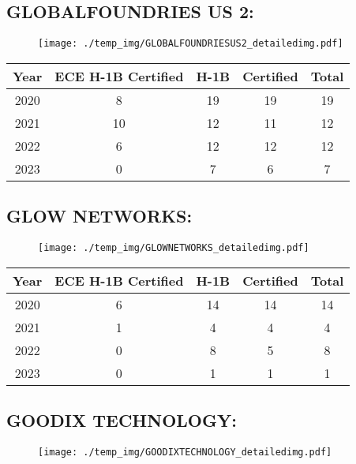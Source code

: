\documentclass{article}%
\begin{document}
%
\newpage%
\subsection{GLOBALFOUNDRIES US 2:}%
\label{subsec:GLOBALFOUNDRIESUS2}%
\label{GLOBALFOUNDRIESUS2detailed}%


\begin{figure}[htbp]%
\centering%
\texttt{[image: ./temp\_img/GLOBALFOUNDRIESUS2\_detailedimg.pdf]}%
\end{figure}

%
\begin{longtable}{c|c|c|c|c}%
\hline%
Year&ECE H{-}1B Certified&H{-}1B&Certified&Total\\%
\hline%
2020&8&19&19&19\\%
\hline%
2021&10&12&11&12\\%
\hline%
2022&6&12&12&12\\%
\hline%
2023&0&7&6&7\\%
\hline%
\end{longtable}

%
\newpage%
\subsection{GLOW NETWORKS:}%
\label{subsec:GLOWNETWORKS}%
\label{GLOWNETWORKSdetailed}%


\begin{figure}[htbp]%
\centering%
\texttt{[image: ./temp\_img/GLOWNETWORKS\_detailedimg.pdf]}%
\end{figure}

%
\begin{longtable}{c|c|c|c|c}%
\hline%
Year&ECE H{-}1B Certified&H{-}1B&Certified&Total\\%
\hline%
2020&6&14&14&14\\%
\hline%
2021&1&4&4&4\\%
\hline%
2022&0&8&5&8\\%
\hline%
2023&0&1&1&1\\%
\hline%
\end{longtable}

%
\newpage%
\subsection{GOODIX TECHNOLOGY:}%
\label{subsec:GOODIXTECHNOLOGY}%
\label{GOODIXTECHNOLOGYdetailed}%


\begin{figure}[htbp]%
\centering%
\texttt{[image: ./temp\_img/GOODIXTECHNOLOGY\_detailedimg.pdf]}%
\end{figure}
\end{document}
